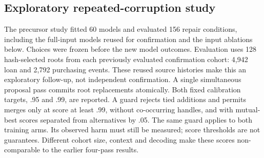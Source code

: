 \subsection{Exploratory repeated-corruption study}
\label{sec:followup}
The precursor study fitted 60 models and evaluated 156 repair conditions, including the full-input models reused for confirmation and the input ablations below. Choices were frozen before the new model outcomes. Evaluation uses 128 hash-selected roots from each previously evaluated confirmation cohort: 4,942 loan and 2,792 purchasing events. These reused source histories make this an exploratory follow-up, not independent confirmation. A single simultaneous proposal pass commits root replacements atomically. Both fixed calibration targets, .95 and .99, are reported. A guard rejects tied additions and permits merges only at score at least .99, without co-occurring handles, and with mutual-best scores separated from alternatives by .05. The same guard applies to both training arms. Its observed harm must still be measured; score thresholds are not guarantees. Different cohort size, context and decoding make these scores non-comparable to the earlier four-pass results.







